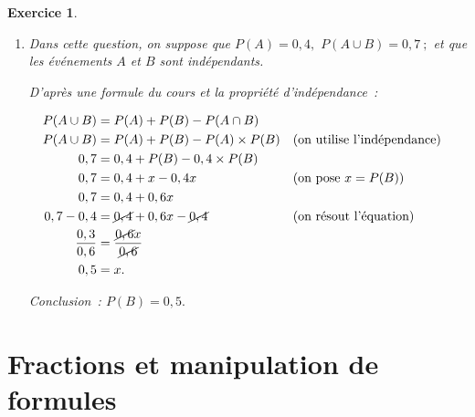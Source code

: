 \documentclass[10pt]{article}
\newtheorem{exo}{Exercice}
\begin{document}
\begin{exo}
\begin{enumerate}
\begin{enumerate}
\end{enumerate}
\item Dans cette question, on suppose que $P(A)=0,4,$ $P(A\cup B)=0,7~;$ et que les événements $A$ et $B$ sont indépendants.

\medskip

D'après une formule du cours et la propriété d'indépendance~:

\begin{align*}
P(A\cup B)&=P(A)+P(B)-P(A\cap B)\\
P(A\cup B)&=P(A)+P(B)-P(A)\times P(B)&&(\text{on utilise l'indépendance})\\
0,7&=0,4+P(B)-0,4 \times P(B)\\
0,7&=0,4+x-0,4 x&&(\text{on pose }x=P(B))\\
0,7&=0,4+0,6 x\\
0,7-0,4&=\cancel{0,4}+0,6x-\cancel{0,4}&&(\text{on résout l'équation})\\
\frac{0,3}{0,6}&=\frac{\cancel{0,6}x}{\cancel{0,6}}\\
0,5&=x.\end{align*}

Conclusion~: $P(B)=0,5.$

\end{enumerate}

\end{exo}

\setcounter{section}{14}
\section{Fractions et manipulation de formules}
\end{document}
